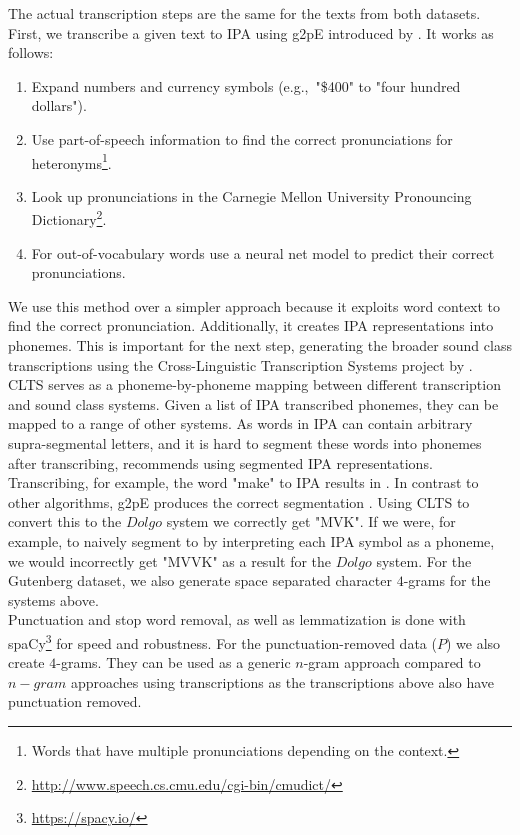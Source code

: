 The actual transcription steps are the same for the texts from both datasets.
First, we transcribe a given text to IPA using g2pE introduced by \cite{kyubyong2019g2pE}.
It works as follows:
\begin{enumerate}
    \item Expand numbers and currency symbols (e.g.,\ "\$400" to "four hundred dollars").
    \item Use part-of-speech information to find the correct pronunciations for heteronyms\footnote{Words that have multiple pronunciations depending on the context.}.
    \item Look up pronunciations in the Carnegie Mellon University Pronouncing Dictionary\footnote{\url{http://www.speech.cs.cmu.edu/cgi-bin/cmudict/}}.
    \item For out-of-vocabulary words use a neural net model to predict their correct pronunciations.
\end{enumerate}
We use this method over a simpler approach because it exploits word context to find the correct pronunciation.
Additionally, it creates IPA representations  into phonemes.
This is important for the next step, generating the broader sound class transcriptions using the Cross-Linguistic Transcription Systems project by \cite{list2018cltsIntro}.
CLTS serves as a phoneme-by-phoneme mapping between different transcription and sound class systems.
Given a list of IPA transcribed phonemes, they can be mapped to a range of other systems.
As words in IPA can contain arbitrary supra-segmental letters, and it is hard to segment these words into phonemes after transcribing, \cite{list2018sequence} recommends using segmented IPA representations.
Transcribing, for example, the word "make" to IPA results in \textipa{[meIk]}.
In contrast to other algorithms, g2pE produces the correct segmentation \textipa{[m eI k]}.
Using CLTS to convert this to the $Dolgo$ system we correctly get "MVK".
If we were, for example, to naively segment \textipa{[meIk]} to \textipa{[m e I k]} by interpreting each IPA symbol as a phoneme, we would incorrectly get "MVVK" as a result for the $Dolgo$ system.
For the Gutenberg dataset, we also generate space separated character $4$-grams for the systems above.\\
Punctuation and stop word removal, as well as lemmatization is done with spaCy\footnote{\url{https://spacy.io/}} for speed and robustness.
For the punctuation-removed data ($P$) we also create $4$-grams.
They can be used as a generic $n$-gram approach compared to $n-gram$ approaches using transcriptions as the transcriptions above also have punctuation removed.

